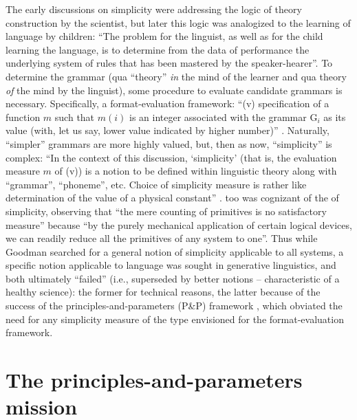 \documentclass[output=paper]{langsci/langscibook}
\begin{document}
The early discussions on simplicity were addressing the logic of theory
construction by the scientist, but later \citep[4]{Chomsky1965} this logic was
analogized to the learning of language by children: “The problem for the
linguist, as well as for the child learning the language, is to determine from
the data of performance the underlying system of rules that has been mastered
by the speaker-hearer”. To determine the grammar (qua “theory” \emph{in} the
mind of the learner and qua theory \emph{of} the mind by the linguist), some
procedure to evaluate candidate grammars is necessary. Specifically, a
format-evaluation framework: “(v) specification of a function $m$ such
that $m(i)$ is an integer associated with the grammar
$\text{G}_i$ as its value (with, let us say, lower value indicated
by higher number)” \parencite[31]{Chomsky1965}. Naturally, “simpler” grammars are more
highly valued, but, then as now, “simplicity” is complex: “In the context of
this discussion, ‘simplicity’ (that is, the evaluation measure $m$ of (v))
is a notion to be defined within linguistic theory along with \enquote{grammar},
\enquote{phoneme}, etc. Choice of simplicity measure is rather like determination of
the value of a physical constant” \parencite[37--38]{Chomsky1965}.
\citet[107--108]{Goodman1943} too was cognizant of the  of simplicity,
observing that “the mere counting of primitives is no satisfactory measure”
because “by the purely mechanical application of certain logical devices, we
can readily reduce all the primitives of any system to one”. Thus while Goodman
searched for a general notion of simplicity applicable to all systems, a
specific notion applicable to language was sought in generative linguistics,
and both ultimately “failed” (i.e., superseded by better notions -- characteristic
of a healthy science): the former for technical reasons, the latter because of
the success of the principles-and-parameters (P\&P) framework
\citep{Chomsky1981}, which obviated the need for any simplicity measure of the
type envisioned for the format-evaluation framework.

\section{The principles-and-parameters mission}
\end{document}
